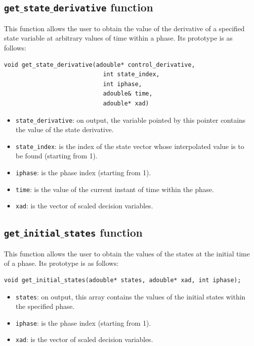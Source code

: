 \documentclass[a4paper,11pt]{report}    %
\begin{document}
\subsection{ \texttt{get$\_$state$\_$derivative} function}

This function allows the user to obtain the value of the derivative of a specified state
variable at arbitrary values of time within a phase. Its prototype is as follows:

\begin{verbatim}
void get_state_derivative(adouble* control_derivative, 
                            int state_index, 
                            int iphase, 
                            adouble& time, 
                            adouble* xad)
\end{verbatim}

\begin{itemize}
 \item \verb|state_derivative|: on output, the variable pointed by this pointer contains the value of the state derivative.
 \item \verb|state_index|:    is the index of the state vector whose interpolated value is to be found (starting from 1).
 \item \verb|iphase|:  is the phase index (starting from 1).
 \item \verb|time|:  is the value of the current instant of time within the phase.
 \item \verb|xad|: is the vector of scaled decision variables.
\end{itemize}




\subsection{ \texttt{get$\_$initial$\_$states} function}

This function allows the user to obtain the values of the states
at the initial time of a phase. Its prototype is as follows:

\begin{verbatim}
void get_initial_states(adouble* states, adouble* xad, int iphase);
\end{verbatim}


\begin{itemize}
 \item \verb|states|: on output, this array contains the values of the initial states within the specified phase.
 \item \verb|iphase|:  is the phase index (starting from 1).
 \item \verb|xad|: is the vector of scaled decision variables.
\end{itemize}
\end{document}
